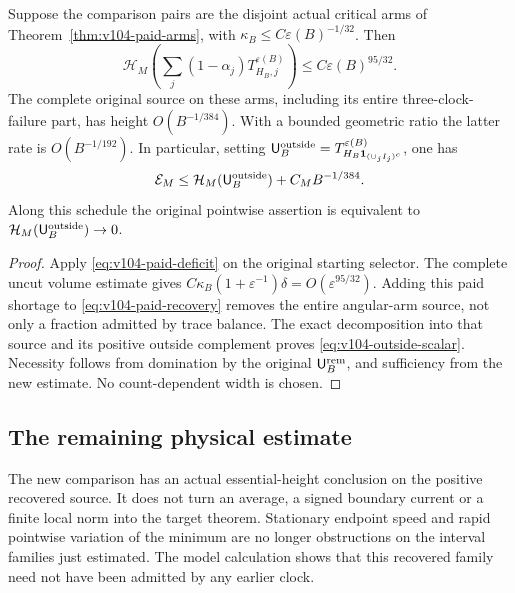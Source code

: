 \begin{corollary}
\label{cor:v104-whole-arm-recovery}
Suppose the comparison pairs are the disjoint actual critical arms
of Theorem~\ref{thm:v104-paid-arms}, with
$\kappa_B\le C\varepsilon(B)^{-1/32}$. Then
\[
 \mathcal H_M\!\left(\sum_j(1-\alpha_j)
                 T_{H_B,j}^{\varepsilon(B)}\right)
                  \le C\varepsilon(B)^{95/32}.
\]
The complete original source on these arms, including its entire
three-clock-failure part, has height $O(B^{-1/384})$. With a bounded
geometric ratio the latter rate is $O(B^{-1/192})$. In particular,
setting $\mathsf U_B^{\rm outside}
=T_{H_B\mathbf1_{(\cup_jI_j)^c}}^{\varepsilon(B)}$, one has
\begin{equation}\label{eq:v104-outside-scalar}
 \mathcal E_M\le\mathcal H_M(\mathsf U_B^{\rm outside})
                                      +C_MB^{-1/384}.
\end{equation}
Along this schedule the original pointwise assertion is equivalent
to $\mathcal H_M(\mathsf U_B^{\rm outside})\to0$.
\end{corollary}
\begin{proof}
Apply \eqref{eq:v104-paid-deficit} on the original starting selector.
The complete uncut volume estimate gives
$C\kappa_B(1+\varepsilon^{-1})\delta
=O(\varepsilon^{95/32})$. Adding this paid shortage to
\eqref{eq:v104-paid-recovery} removes the entire angular-arm source,
not only a fraction admitted by trace balance. The exact decomposition
into that source and its positive outside complement proves
\eqref{eq:v104-outside-scalar}. Necessity follows from domination by
the original $\mathsf U_B^{\rm rem}$, and sufficiency from the
new estimate. No count-dependent width is chosen.
\end{proof}

\subsection{The remaining physical estimate}
The new comparison has an actual essential-height conclusion on the
positive recovered source. It does not turn an average, a signed
boundary current or a finite local norm into the target theorem.
Stationary endpoint speed and rapid pointwise variation of the minimum
are no longer obstructions on the interval families just estimated.
The model calculation shows that this recovered family need not have
been admitted by any earlier clock.

